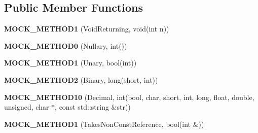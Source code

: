 \subsection*{Public Member Functions}
\begin{DoxyCompactItemize}
\item 
\mbox{\label{classtesting_1_1gmock__function__mocker__test_1_1LegacyMockFoo_a8262f43f13e4a14a3a1701a22b70dbce}} 
{\bfseries M\+O\+C\+K\+\_\+\+M\+E\+T\+H\+O\+D1} (Void\+Returning, void(int n))
\item 
\mbox{\label{classtesting_1_1gmock__function__mocker__test_1_1LegacyMockFoo_af7292c8acf4a42f4de86e857d0310013}} 
{\bfseries M\+O\+C\+K\+\_\+\+M\+E\+T\+H\+O\+D0} (Nullary, int())
\item 
\mbox{\label{classtesting_1_1gmock__function__mocker__test_1_1LegacyMockFoo_a303e06bec9e89322d50d78c65d612a33}} 
{\bfseries M\+O\+C\+K\+\_\+\+M\+E\+T\+H\+O\+D1} (Unary, bool(int))
\item 
\mbox{\label{classtesting_1_1gmock__function__mocker__test_1_1LegacyMockFoo_ae579eeb5d0e6fa5200868cb1d74ccdb7}} 
{\bfseries M\+O\+C\+K\+\_\+\+M\+E\+T\+H\+O\+D2} (Binary, long(short, int))
\item 
\mbox{\label{classtesting_1_1gmock__function__mocker__test_1_1LegacyMockFoo_a129f7eee269cfdee37758ec15b795fee}} 
{\bfseries M\+O\+C\+K\+\_\+\+M\+E\+T\+H\+O\+D10} (Decimal, int(bool, char, short, int, long, float, double, unsigned, char $\ast$, const std\+::string \&str))
\item 
\mbox{\label{classtesting_1_1gmock__function__mocker__test_1_1LegacyMockFoo_adf03410bee6d7f5345036857b48d2a38}} 
{\bfseries M\+O\+C\+K\+\_\+\+M\+E\+T\+H\+O\+D1} (Takes\+Non\+Const\+Reference, bool(int \&))
\item 
\mbox{\label{classtesting_1_1gmock__function__mocker__test_1_1LegacyMockFoo_a842e5e4499f9042ac2193e31b19b98c1}} 

\end{DoxyCompactItemize}
